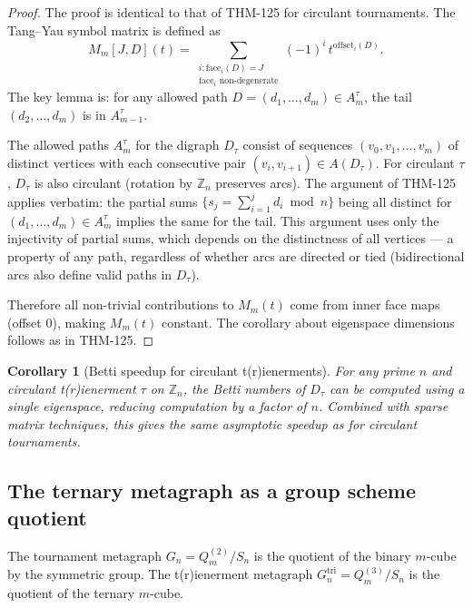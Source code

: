 \documentclass[12pt,reqno]{amsart}
\newtheorem{corollary}[theorem]{Corollary}
\theoremstyle{definition}
\theoremstyle{plain}
\begin{document}
\begin{proof}
The proof is identical to that of THM-125 \cite{Cassidy2026} for circulant
tournaments.  The Tang--Yau symbol matrix is defined as
\[
  M_m[J,D](t)=\sum_{\substack{i:\text{face}_i(D)=J\\\text{face}_i \text{ non-degenerate}}}
              (-1)^i\,t^{\mathrm{offset}_i(D)}.
\]
The key lemma is: for any allowed path $D=(d_1,\ldots,d_m)\in A_m^{\tau}$,
the tail $(d_2,\ldots,d_m)$ is in $A_{m-1}^{\tau}$.

\smallskip
The allowed paths $A_m^{\tau}$ for the digraph $D_\tau$ consist of sequences
$(v_0,v_1,\ldots,v_m)$ of distinct vertices with each consecutive pair
$(v_i,v_{i+1})\in A(D_\tau)$.  For circulant $\tau$, $D_\tau$ is also circulant
(rotation by $\mathbb{Z}_n$ preserves arcs).  The argument of THM-125 applies
verbatim: the partial sums $\{s_j=\sum_{i=1}^j d_i\bmod n\}$ being all distinct
for $(d_1,\ldots,d_m)\in A_m^{\tau}$ implies the same for the tail.  This
argument uses only the injectivity of partial sums, which depends on the
distinctness of all vertices — a property of any path, regardless of whether
arcs are directed or tied (bidirectional arcs also define valid paths in $D_\tau$).

\smallskip
Therefore all non-trivial contributions to $M_m(t)$ come from inner face maps
(offset 0), making $M_m(t)$ constant.  The corollary about eigenspace dimensions
follows as in THM-125.
\end{proof}

\begin{corollary}[Betti speedup for circulant t(r)ienerments]\label{cor:speedup}
For any prime $n$ and circulant t(r)ienerment $\tau$ on $\mathbb{Z}_n$,
the Betti numbers of $D_\tau$ can be computed using a single eigenspace,
reducing computation by a factor of $n$.  Combined with sparse matrix techniques,
this gives the same asymptotic speedup as for circulant tournaments.
\end{corollary}

\subsection{The ternary metagraph as a group scheme quotient}
\label{ssec:scheme-quotient}

The tournament metagraph $G_n=Q_m^{(2)}/S_n$ is the quotient of the binary
$m$-cube by the symmetric group.  The t(r)ienerment metagraph
$G_n^{\mathrm{tri}}=Q_m^{(3)}/S_n$ is the quotient of the ternary $m$-cube.
\end{document}
